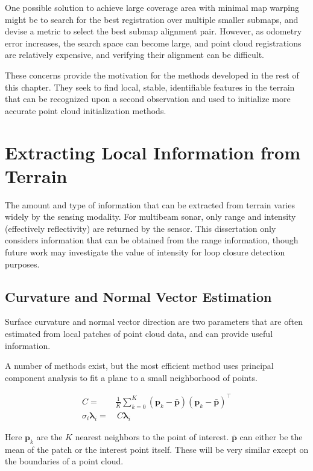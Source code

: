One possible solution to achieve large coverage area with minimal map warping might be to search for the best registration over multiple smaller submaps, and devise a metric to select the best submap alignment pair. However, as odometry error increases, the search space can become large, and point cloud registrations are relatively expensive, and verifying their alignment can be difficult. 

These concerns provide the motivation for the methods developed in the rest of this chapter. They seek to find local, stable, identifiable features in the terrain that can be recognized upon a second observation and used to initialize more accurate point cloud initialization methods. 

\section{Extracting Local Information from Terrain}

The amount and type of information that can be extracted from terrain varies widely by the sensing modality. For multibeam sonar, only range and intensity (effectively reflectivity) are returned by the sensor. This dissertation only considers information that can be obtained from the range information, though future work may investigate the value of intensity for loop closure detection purposes.

\subsection{Curvature and Normal Vector Estimation}

Surface curvature and normal vector direction are two parameters that are often estimated from local patches of point cloud data, and can provide useful information. 

A number of methods exist, but the most efficient method uses principal component analysis to fit a plane to a small neighborhood of points. 

\begin{align} %
   C = ~&\frac{1}{K} \sum\limits_{k=0}^{K} (\mathbf{p}_k - \mathbf{\bar{p}})  (\mathbf{p}_k - \mathbf{\bar{p}})^\intercal \\
   \sigma_i\mathbf{\lambda}_i = &~ C\mathbf{\lambda}_i
\end{align}

Here $\mathbf{p}_k$ are the $K$ nearest neighbors to the point of interest. $\mathbf{\bar{p}}$ can either be the mean of the patch or the interest point itself. These will be very similar except on the boundaries of a point cloud.

